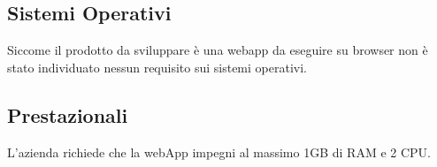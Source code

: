 \documentclass[12pt]{article}
\begin{document}
\subsection{Sistemi Operativi}
Siccome il prodotto da sviluppare è una webapp da eseguire su browser non è stato individuato nessun requisito sui sistemi operativi.
\subsection{Prestazionali}
L'azienda richiede che la webApp impegni al massimo 1GB di RAM e 2 CPU.
\end{document}

